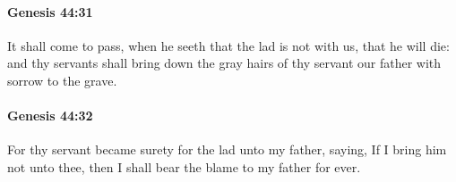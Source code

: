 		\paragraph{Genesis 44:31} %
			\label{GENESIS-44-31}

			It shall come to pass, when he seeth that the lad is not with us, that he will die: and thy servants shall bring down the gray hairs of thy servant our father with sorrow to the grave.


		\paragraph{Genesis 44:32} %
			\label{GENESIS-44-32}

			For thy servant became surety for the lad unto my father, saying, If I bring him not unto thee, then I shall bear the blame to my father for ever.


